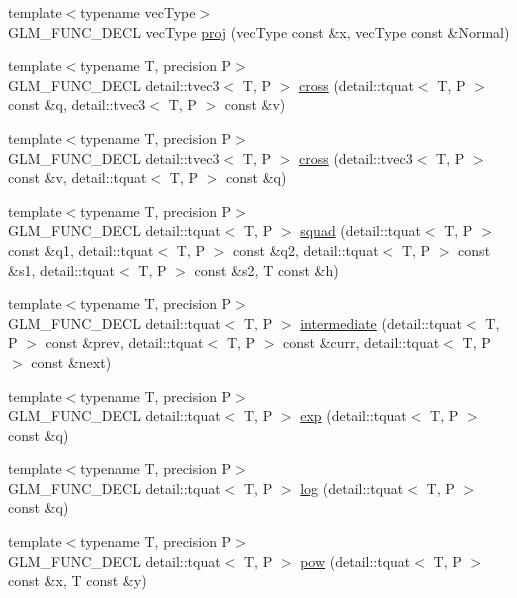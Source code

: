 \begin{CompactItemize}
\item 
{\footnotesize template$<$typename vecType$>$ }\\GLM\_\-FUNC\_\-DECL vecType \hyperlink{group__gtx__projection_g2a2ab28abbc6fa33c226ea8dd9ccd8cd}{proj} (vecType const \&x, vecType const \&Normal)
\item 
{\footnotesize template$<$typename T, precision P$>$ }\\GLM\_\-FUNC\_\-DECL detail::tvec3$<$ T, P $>$ \hyperlink{group__gtx__quaternion_g968a8e63b616c369286b541a3ac96484}{cross} (detail::tquat$<$ T, P $>$ const \&q, detail::tvec3$<$ T, P $>$ const \&v)
\item 
{\footnotesize template$<$typename T, precision P$>$ }\\GLM\_\-FUNC\_\-DECL detail::tvec3$<$ T, P $>$ \hyperlink{group__gtx__quaternion_gd81a2ea5c1048d8101ce2876eb6569f7}{cross} (detail::tvec3$<$ T, P $>$ const \&v, detail::tquat$<$ T, P $>$ const \&q)
\item 
{\footnotesize template$<$typename T, precision P$>$ }\\GLM\_\-FUNC\_\-DECL detail::tquat$<$ T, P $>$ \hyperlink{group__gtx__quaternion_g8ed8845077927e9b8fc7bd74872c161a}{squad} (detail::tquat$<$ T, P $>$ const \&q1, detail::tquat$<$ T, P $>$ const \&q2, detail::tquat$<$ T, P $>$ const \&s1, detail::tquat$<$ T, P $>$ const \&s2, T const \&h)
\item 
{\footnotesize template$<$typename T, precision P$>$ }\\GLM\_\-FUNC\_\-DECL detail::tquat$<$ T, P $>$ \hyperlink{group__gtx__quaternion_ge94a070898e8be560a5dcf8e15854b2d}{intermediate} (detail::tquat$<$ T, P $>$ const \&prev, detail::tquat$<$ T, P $>$ const \&curr, detail::tquat$<$ T, P $>$ const \&next)
\item 
{\footnotesize template$<$typename T, precision P$>$ }\\GLM\_\-FUNC\_\-DECL detail::tquat$<$ T, P $>$ \hyperlink{group__gtx__quaternion_gd4ec8f59911f01bb4c298839017ba91f}{exp} (detail::tquat$<$ T, P $>$ const \&q)
\item 
{\footnotesize template$<$typename T, precision P$>$ }\\GLM\_\-FUNC\_\-DECL detail::tquat$<$ T, P $>$ \hyperlink{group__gtx__quaternion_gbed81c73a777fce84fe442bbc17c13ce}{log} (detail::tquat$<$ T, P $>$ const \&q)
\item 
{\footnotesize template$<$typename T, precision P$>$ }\\GLM\_\-FUNC\_\-DECL detail::tquat$<$ T, P $>$ \hyperlink{group__gtx__quaternion_g49e7cd8958d474290778760d171a44d2}{pow} (detail::tquat$<$ T, P $>$ const \&x, T const \&y)

\end{CompactItemize}
